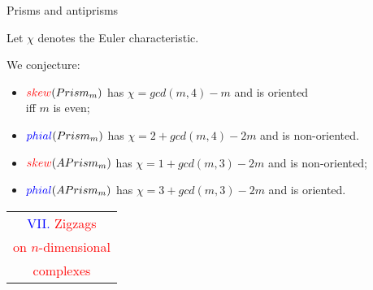 \documentclass[%
pdf,
colorBG,
slideColor,
]{prosper}
\begin{document}
\begin{slide}{Prisms and antiprisms}

Let $\chi$ denotes the Euler characteristic.

We conjecture:


\begin{itemize}
\item 
$\textcolor{red}{skew}(Prism_m)$ has $\chi=gcd(m,4)-m$ and is oriented\\
iff $m$ is even;

\item $\textcolor{blue}{phial}(Prism_m)$ has $\chi=2+gcd(m,4)-2m$ and is non-oriented.

\vspace{3mm}

\item $\textcolor{red}{skew}(APrism_m)$ has $\chi=1+gcd(m,3)-2m$ and is non-oriented;


\item $\textcolor{blue}{phial}(APrism_m)$ has $\chi=3+gcd(m,3)-2m$ and is oriented.
\end{itemize}


\end{slide}



\begin{slide}{}
\begin{center}
{\Huge 
\begin{tabular*}{8cm}{c}
\\[-0.5cm]
\textcolor{blue}{VII. }\textcolor{red}{Zigzags}\\
\textcolor{red}{on $n$-dimensional}\\
\textcolor{red}{complexes}
\end{tabular*}
}
\end{center}
\end{slide}
\end{document}
